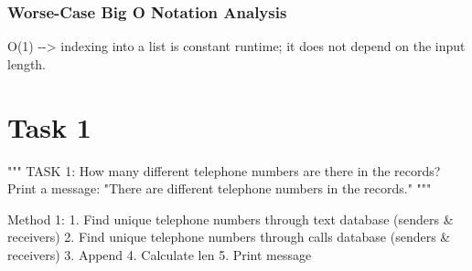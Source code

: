 \documentclass[11pt]{article}
\begin{document}
    \subsubsection{Worse-Case Big O Notation
Analysis}\label{worse-case-big-o-notation-analysis}

    O(1) -\/-\textgreater{} indexing into a list is constant runtime; it
does not depend on the input length.

    \section{Task 1}\label{task-1}

    """ TASK 1: How many different telephone numbers are there in the
records? Print a message: "There are different telephone numbers in the
records." """

    Method 1: 1. Find unique telephone numbers through text database
(senders \& receivers) 2. Find unique telephone numbers through calls
database (senders \& receivers) 3. Append 4. Calculate len 5. Print
message
\end{document}
